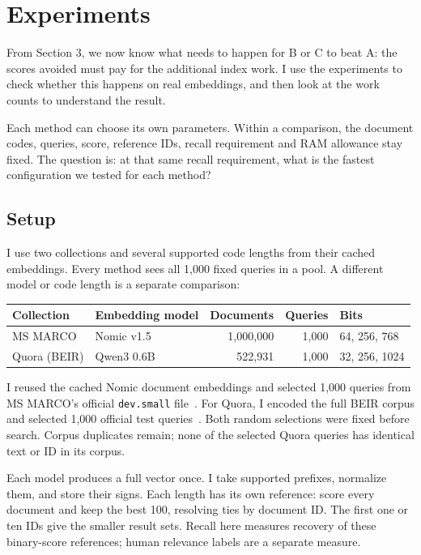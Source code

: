 \section{Experiments}
From Section 3, we now know what needs to happen for B or C to beat A: the scores avoided must pay for the additional index work. I use the experiments to check whether this happens on real embeddings, and then look at the work counts to understand the result.

Each method can choose its own parameters. Within a comparison, the document codes, queries, score, reference IDs, recall requirement and RAM allowance stay fixed. The question is: at that same recall requirement, what is the fastest configuration we tested for each method?

\subsection{Setup}
I use two collections and several supported code lengths from their cached embeddings. Every method sees all 1,000 fixed queries in a pool. A different model or code length is a separate comparison:

\begin{center}\small
\begin{tabular}{@{}llrrl@{}}\toprule
Collection & Embedding model & Documents & Queries & Bits\\\midrule
MS MARCO & Nomic v1.5 & 1,000,000 & 1,000 & 64, 256, 768\\
Quora (BEIR) & Qwen3 0.6B & 522,931 & 1,000 & 32, 256, 1024\\\bottomrule
\end{tabular}
\end{center}
I reused the cached Nomic document embeddings and selected 1,000 queries from MS MARCO's official \texttt{dev.small} file~\cite{msmarco,nomic}. For Quora, I encoded the full BEIR corpus and selected 1,000 official test queries~\cite{beir,qwen}. Both random selections were fixed before search. Corpus duplicates remain; none of the selected Quora queries has identical text or ID in its corpus.

Each model produces a full vector once. I take supported prefixes, normalize them, and store their signs. Each length has its own reference: score every document and keep the best 100, resolving ties by document ID. The first one or ten IDs give the smaller result sets. Recall here measures recovery of these binary-score references; human relevance labels are a separate measure.

